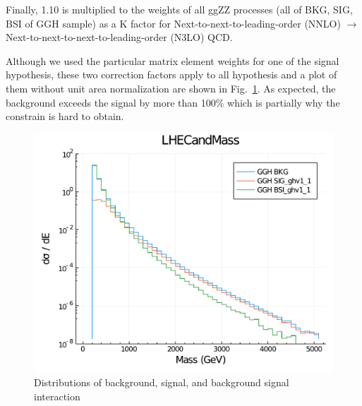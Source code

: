 Finally, 1.10 is multiplied to the weights of all ggZZ processes (all of BKG, SIG, BSI
of GGH sample) as a K factor for Next-to-next-to-leading-order (NNLO) $\rightarrow$ 
Next-to-next-to-next-to-leading-order (N3LO) QCD.

Although we used the particular matrix element weights for one of the signal hypothesis, these two
correction factors apply to all hypothesis and a plot of them without unit area normalization are shown
in Fig.~\ref{fig:bsi_sig_bkg_compare}. As expected, the background exceeds the signal by more than 100\%
which is partially why the constrain is hard to obtain.
\begin{figure}[htb]
    \begin{center}
        \includegraphics[width=.7\linewidth]{fig/LHE_integral_difference.pdf}
    \end{center}
    \caption{Distributions of background, signal, and background signal interaction}
    \label{fig:bsi_sig_bkg_compare}
\end{figure}
